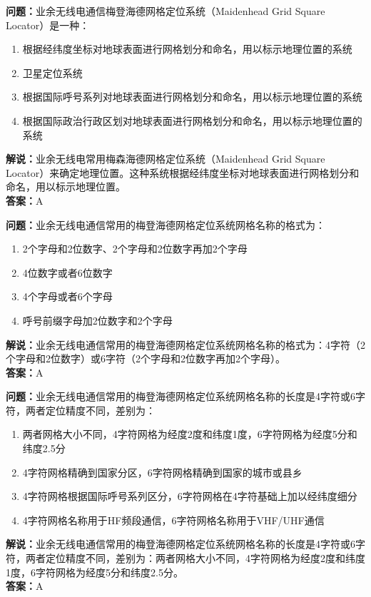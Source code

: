 \documentclass[UTF8]{ctexbook}
\begin{document}
\textbf{问题：}业余无线电通信梅登海德网格定位系统（Maidenhead Grid Square Locator）是一种：
\begin{enumerate}[label=\Alph*), leftmargin=3em]
  \item 根据经纬度坐标对地球表面进行网格划分和命名，用以标示地理位置的系统
  \item 卫星定位系统
  \item 根据国际呼号系列对地球表面进行网格划分和命名，用以标示地理位置的系统
  \item 根据国际政治行政区划对地球表面进行网格划分和命名，用以标示地理位置的系统
\end{enumerate}
\textbf{解说：}业余无线电常用梅森海德网格定位系统（Maidenhead Grid Square Locator）来确定地理位置。这种系统根据经纬度坐标对地球表面进行网格划分和命名，用以标示地理位置。\\
\textbf{答案：}A

\textbf{问题：}业余无线电通信常用的梅登海德网格定位系统网格名称的格式为：
\begin{enumerate}[label=\Alph*), leftmargin=3em]
  \item 2个字母和2位数字、2个字母和2位数字再加2个字母
  \item 4位数字或者6位数字
  \item 4个字母或者6个字母
  \item 呼号前缀字母加2位数字和2个字母
\end{enumerate}
\textbf{解说：}业余无线电通信常用的梅登海德网格定位系统网格名称的格式为：4字符（2个字母和2位数字）或6字符（2个字母和2位数字再加2个字母）。\\
\textbf{答案：}A

\textbf{问题：}业余无线电通信常用的梅登海德网格定位系统网格名称的长度是4字符或6字符，两者定位精度不同，差别为：
\begin{enumerate}[label=\Alph*), leftmargin=3em]
  \item 两者网格大小不同，4字符网格为经度2度和纬度1度，6字符网格为经度5分和纬度2.5分
  \item 4字符网格精确到国家分区，6字符网格精确到国家的城市或县乡
  \item 4字符网格根据国际呼号系列区分，6字符网格在4字符基础上加以经纬度细分
  \item 4字符网格名称用于HF频段通信，6字符网格名称用于VHF/UHF通信
\end{enumerate}
\textbf{解说：}业余无线电通信常用的梅登海德网格定位系统网格名称的长度是4字符或6字符，两者定位精度不同，差别为：两者网格大小不同，4字符网格为经度2度和纬度1度，6字符网格为经度5分和纬度2.5分。\\
\textbf{答案：}A
\end{document}
